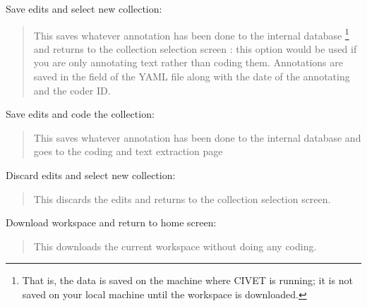 \documentclass[letterpaper,10pt,english]{sphinxmanual}
\begin{document}
Save edits and select new collection:
\begin{quote}

This saves whatever annotation has been done to the internal
database \footnote{
That is, the data is saved on the machine where CIVET is running; it
is not saved on your local machine until the workspace is downloaded.
} and returns to the collection selection screen :
this option would be used if you are only annotating text rather
than coding them. Annotations are saved in the  field
of the YAML file along with the date of the annotating and the
coder ID.
\end{quote}

Save edits and code the collection:
\begin{quote}

This saves whatever annotation has been done to the internal
database and goes to the coding and text extraction page
\end{quote}

Discard edits and select new collection:
\begin{quote}

This discards the edits and returns to the collection selection screen.
\end{quote}

Download workspace and return to home screen:
\begin{quote}

This downloads the current workspace without doing any coding.
\end{quote}
\end{document}
